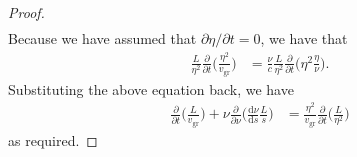 \documentclass[10pt]{article}
\newcommand{\dee}{\mathrm{d}}
\newcommand{\group}{\mathrm{gr}}
\begin{document}
\begin{itemize}
\begin{proof}
\begin{align*}
      \end{align*}
      Because we have assumed that $\partial \eta /\partial t = 0$, we have that
      \begin{align*}
        \frac{L}{\eta^2} \frac{\partial}{\partial t} \bigg( \frac{\eta^2}{v_\group}
        \bigg)
        &= \frac{\nu}{c} \frac{L}{\eta^2} \frac{\partial }{\partial t}\bigg( \eta^2 \frac{\eta}{\nu}\bigg).
      \end{align*}
      Substituting the above equation back, we have
      \begin{align*}
        \frac{\partial}{\partial t} \bigg( \frac{L}{v_\group} \bigg)
        +\nu \frac{\partial }{\partial \nu} \bigg( \frac{\dee \nu}{\dee s} \frac{L}{s} \bigg)
        &= \frac{\eta^2}{v_\group} \frac{\partial}{\partial t} \bigg( \frac{L}{\eta^2} \bigg)
      \end{align*}
      as required.
    \end{proof}
  \end{itemize}
\end{document}
